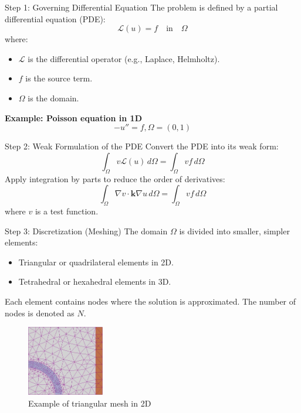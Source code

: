 \documentclass{beamer}
\begin{document}
\begin{frame}{Step 1: Governing Differential Equation}
    The problem is defined by a partial differential equation (PDE):
    \[
    \mathcal{L}(u) = f \quad \text{in} \quad \Omega
    \]
    where:
    \begin{itemize}
        \item \( \mathcal{L} \) is the differential operator (e.g., Laplace, Helmholtz).
        \item \( f \) is the source term.
        \item \( \Omega \) is the domain.
    \end{itemize}
    \textbf{Example: Poisson equation in 1D}
    \[- u'' = f, \Omega = (0,1) \]
\end{frame}

\begin{frame}{Step 2: Weak Formulation of the PDE}
    Convert the PDE into its weak form:
    \[
    \int_\Omega v \mathcal{L}(u) \, d\Omega = \int_\Omega v f \, d\Omega
    \]
    Apply integration by parts to reduce the order of derivatives:
    \[
    \int_\Omega \nabla v \cdot \mathbf{k} \nabla u \, d\Omega = \int_\Omega v f \, d\Omega
    \]
    where \( v \) is a test function.
\end{frame}

\begin{frame}{Step 3: Discretization (Meshing)}
    The domain \( \Omega \) is divided into smaller, simpler elements:
    \begin{itemize}
        \item Triangular or quadrilateral elements in 2D.
        \item Tetrahedral or hexahedral elements in 3D.
    \end{itemize}
    Each element contains nodes where the solution is approximated. The number of nodes is denoted as \( N \).

  \begin{figure}
    \includegraphics[width=0.3\textwidth]{mesh.png}
    \caption{Example of triangular mesh in 2D}
  \end{figure}
\end{frame}
\end{document}

